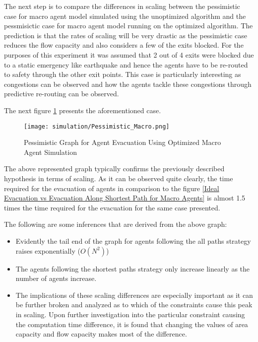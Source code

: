 The next step is to compare the differences in scaling between the pessimistic case for  macro agent model simulated using the unoptimized algorithm and the pessmisictic case for macro agent model running on the optimized algorithm. The prediction is that the rates of scaling will be very drastic as the pessimistic case reduces the flow capacity and also considers a few of the exits blocked. For the purposes of this experiment it was assumed that 2 out of 4 exits were blocked due to a static emergency like earthquake and hence the agents have to be re-routed to safety through the other exit points. This case is particularly interesting as congestions can be observed and how the agents tackle these congestions through predictive re-routing can be observed. 

The next figure \ref{Pessimistic Graph for Agent Evacuation Using Optimized Macro Agent Simulation} presents the aforementioned case.

\begin{figure}[H]
  \centering
  \texttt{[image: simulation/Pessimistic\_Macro.png]}
  \caption{Pessimistic Graph for Agent Evacuation Using Optimized Macro Agent Simulation}
  \label{Pessimistic Graph for Agent Evacuation Using Optimized Macro Agent Simulation}
\end{figure}


The above represented graph typically confirms the previously described hypothesis in terms of scaling. As it can be observed quite clearly, the time required for the evacuation of agents in comparison to the figure \ref{Ideal Evacuation vs Evacuation Along Shortest Path for Macro Agents} is almost 1.5 times the time required for the evacuation for the same case presented.

The following are some inferences that are derived from the above graph:

\begin{itemize}
  \item Evidently the tail end of the graph for agents following the all paths strategy raises exponentially ($O(N^2)$)
  \item The agents following the shortest paths strategy only increase linearly as the number of agents increase.
  \item The implications of these scaling differences are especially important as it can be further broken and analyzed as to which of the constraints cause this peak in scaling. Upon further investigation into the particular constraint causing the computation time difference, it is found that changing the values of area capacity and flow capacity makes most of the difference.
\end{itemize}

